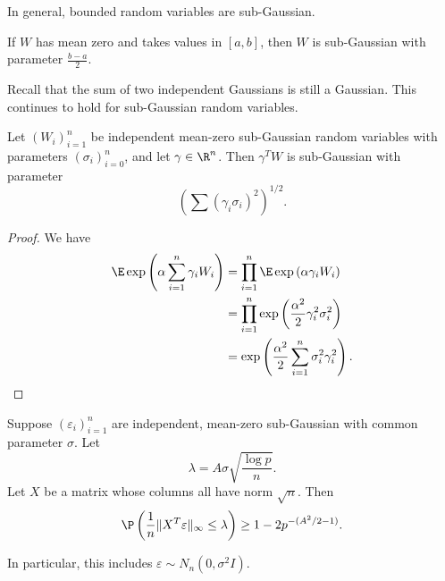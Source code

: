 \documentclass[a4paper]{article}
\begin{document}
In general, bounded random variables are sub-Gaussian.
\begin{lemma}
  If $W$ has mean zero and takes values in $[a, b]$, then $W$ is sub-Gaussian with parameter $\frac{b - a}{2}$.\qedsym
\end{lemma}

Recall that the sum of two independent Gaussians is still a Gaussian. This continues to hold for sub-Gaussian random variables.

\begin{prop}
  Let $(W_i)_{i = 1}^n$ be independent mean-zero sub-Gaussian random variables with parameters $(\sigma_i)_{i = 0}^n$, and let $\gamma \in \R^n$. Then $\gamma^T W$ is sub-Gaussian with parameter
  \[
    \left(\sum (\gamma_i \sigma_i)^2\right)^{1/2}.
  \]
\end{prop}

\begin{proof}
  We have
  \begin{align*}
    \E \exp \left(\alpha \sum_{i = 1}^n \gamma_i W_i\right) &= \prod_{i = 1}^n \E \exp \left(\alpha \gamma_i W_i\right)\\
    &= \prod_{i = 1}^n \exp\left(\frac{\alpha^2}{2} \gamma_i^2 \sigma_i^2\right)\\
    &= \exp\left(\frac{\alpha^2}{2} \sum_{i = 1}^n \sigma_i^2 \gamma_i^2\right).\qedhere
  \end{align*}
\end{proof}

\begin{lemma}
  Suppose $(\varepsilon_i)_{i = 1}^n$ are independent, mean-zero sub-Gaussian with common parameter $\sigma$. Let
  \[
    \lambda = A \sigma \sqrt{\frac{\log p}{n}}.
  \]
  Let $X$ be a matrix whose columns all have norm $\sqrt{n}$. Then
  \[
    \P\left(\frac{1}{n} \|X^T \varepsilon\|_{\infty} \leq \lambda\right) \geq 1 - 2p^{-(A^2/2 - 1)}. %
  \]
\end{lemma}
In particular, this includes $\varepsilon \sim N_n(0, \sigma^2I)$.
\end{document}
